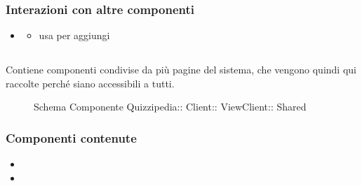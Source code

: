 \subsubsection{Interazioni con altre componenti}
\begin{itemize}
\item {}
\begin{itemize}
\item usa  per aggiungi
\end{itemize}
\end{itemize}
\subsection{}
Contiene componenti condivise da più pagine del sistema, che vengono quindi qui raccolte perché siano accessibili a tutti.
\begin{figure}[H]
\centering
\noindent{}
\caption[Schema Componente Shared]{Schema Componente Quizzipedia:: Client:: ViewClient:: Shared}
\end{figure}
\subsubsection{Componenti contenute}
\begin{itemize}
\item {}
\item {}
\end{itemize}
